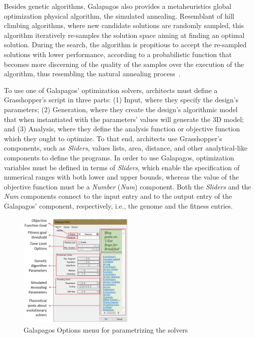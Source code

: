 Besides genetic algorithms, Galapagos also provides a metaheuristics global optimization physical algorithm, the simulated annealing. Resemblant of hill climbing algorithms, where new candidate solutions are randomly sampled, this algorithm iteratively re-samples the solution space aiming at finding an optimal solution. During the search, the algorithm is propitious to accept the re-sampled solutions with lower performance, according to a probabilistic function that becomes more discerning of the quality of the samples over the execution of the algorithm, thus resembling the natural annealing process~\cite{Brownlee2011}. 

To use one of Galapagos' optimization solvers, architects must define a Grasshopper's script in three parts: (1) Input, where they specify the design's parameters; (2) Generation, where they create the design's algorithmic model that when instantiated with the parameters' values will generate the 3D model; and (3) Analysis, where they define the analysis function or objective function which they ought to optimize. To that end, architects use Grasshopper's components, such as \textit{Sliders}, values lists, area, distance, and other analytical-like components to define the programs. In order to use Galapagos, optimization variables must be defined in terms of \textit{Sliders}, which enable the specification of numerical ranges with both lower and upper bounds, whereas the value of the objective function must be a \textit{Number} (\textit{Num}) component. Both the \textit{Sliders} and the \textit{Num} components connect to the input entry and to the output entry of the Galapagos' component, respectively, i.e., the genome and the fitness entries. 

\begin{figure}
\centering
\includegraphics[width=0.5\textwidth]{Images/Background/Galapagos/galapagos-options-menu.PNG}
\caption[Galapagos algorithm's configuration menu]{Galapagos Options menu for parametrizing the solvers}
\label{fig:galapagossetup}
\end{figure}

